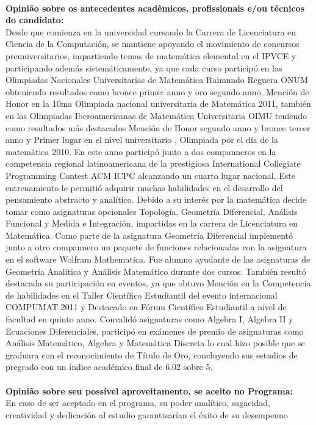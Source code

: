 \documentclass[11pt]{article}
\begin{document}
\\
\textbf{Opinião sobre os antecedentes acadêmicos, profissionais e/ou técnicos do candidato:}
\\Desde que comienza en la universidad cursando la Carrera de Licenciatura en Ciencia de la Computación, se mantiene apoyando el movimiento de concursos preuniversitarios, impartiendo temas de matemática elemental en el IPVCE y participando además sistemáticamente, ya que cada curso participó en las Olimpiadas Nacionales Universitarias de Matemática Raimundo Reguera ONUM obteniendo resultados como bronce primer anno y oro segundo anno, Mención de Honor en la 10ma Olimpiada nacional universitaria de Matemática 2011, también en las Olimpiadas Iberoamericanas de Matemática Universitaria OIMU teniendo como resultados más destacados Mención de Honor segundo anno y bronce tercer anno y Primer lugar en el nivel universitario , Olimpiada por el día de la matemática 2010. En este anno participó junto a dos companneros en la competencia regional latinoamericana de la prestigiosa International Collegiate Programming Contest ACM ICPC alcanzando un cuarto lugar nacional. Este entrenamiento le permitió adquirir muchas habilidades en el desarrollo del pensamiento abstracto y analítico. 
Debido a su interés por la matemática decide tomar como asignaturas opcionales Topología, Geometría Diferencial, Análisis Funcional y Medida e Integración, impartidas en la carrera de Licenciatura en Matemática. Como parte de la asignatura Geometría Diferencial implementó junto a otro compannero un paquete de funciones relacionadas con la asignatura en el software Wolfram Mathematica. Fue alumno ayudante de las asignaturas de Geometría Analítica y Análisis Matemático durante dos cursos. También resultó destacada su participación en eventos, ya que obtuvo Mención en la Competencia de habilidades en el Taller Científico Estudiantil del evento internacional COMPUMAT 2011 y Destacado en Fórum Científico Estudiantil a nivel de facultad en quinto anno. Convalidó asignaturas como Algebra I, Algebra II y Ecuaciones Diferenciales, participó en exámenes de premio de asignaturas como Análisis Matemático, Algebra y  Matemática Discreta lo cual hizo posible que se graduara con el reconocimiento de Título de Oro, concluyendo sus estudios de pregrado con un índice académico final de 6.02 sobre 5.\\
\\
\textbf{Opinião sobre seu possível aproveitamento, se aceito no Programa:}
\\En caso de ser aceptado en el programa, su poder analítico,  sagacidad, creatividad y dedicación al estudio garantizarían el éxito de su desempenno\\ 
\end{document}
